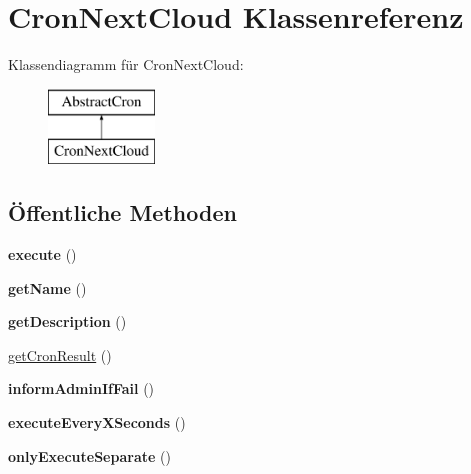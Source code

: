 \hypertarget{class_cron_next_cloud}{}\section{Cron\+Next\+Cloud Klassenreferenz}
\label{class_cron_next_cloud}
Klassendiagramm für Cron\+Next\+Cloud\+:\begin{figure}[H]
\begin{center}
\leavevmode
\includegraphics[height=2.000000cm]{class_cron_next_cloud}
\end{center}
\end{figure}
\subsection*{Öffentliche Methoden}
\begin{DoxyCompactItemize}
\item 
\mbox{\label{class_cron_next_cloud_a47c75300369da49ed33431956de4bca2}} 
{\bfseries execute} ()
\item 
\mbox{\label{class_cron_next_cloud_a5403572194d4e23e8f6d0a12387a4c13}} 
{\bfseries get\+Name} ()
\item 
\mbox{\label{class_cron_next_cloud_a4b009c63a76e2a809880717d7ba46eda}} 
{\bfseries get\+Description} ()
\item 
\mbox{\hyperlink{class_cron_next_cloud_a0fd37ee9a76c63bcf9cfe93aa441e7c1}{get\+Cron\+Result}} ()
\item 
\mbox{\label{class_cron_next_cloud_a84e14de82ead71fd787fe989862e4724}} 
{\bfseries inform\+Admin\+If\+Fail} ()
\item 
\mbox{\label{class_cron_next_cloud_a2918780e0a59a95357550390caa79306}} 
{\bfseries execute\+Every\+X\+Seconds} ()
\item 
\mbox{\label{class_cron_next_cloud_a978f37058f76375be0ac1e9cbf86ef12}} 
{\bfseries only\+Execute\+Separate} ()
\end{DoxyCompactItemize}


